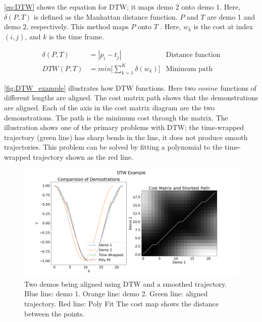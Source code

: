  \autoref{eq:DTW} shows the equation for DTW; it maps demo 2 onto demo 1. Here, $\delta (P, T)$ is defined as the Manhattan distance function. $P$ and $T$ are demo 1 and demo 2, respectively. This method maps $P$ onto $T$ . Here, $w_k$ is the cost at index $(i,j)$, and $k$ is the time frame.
 
 \begin{equation} 
    \begin{aligned} 
         \delta (P,T) &= | p_i - t_j| & \text{Distance function} \\ 
        DTW(P,T) &= min \Bigg[ \sum_{k=1}^{K} \delta (w_k) \Bigg] & \text{Minimum path} 
    \end{aligned} 
    \label{eq:DTW} 
\end{equation} 

 
 
 \autoref{fig:DTW_example} illustrates how DTW functions. Here two $cosine$ functions of different lengths are aligned. The cost matrix path shows that the demonstrations are aligned. Each of the axis in the cost matrix diagram are the two demonstrations. The path is the minimum cost through the matrix. The illustration shows one of the primary problems with DTW; the time-wrapped trajectory (green line) has sharp bends in the line, it does not produce smooth trajectories. This problem can be solved by fitting a polynomial to the time-wrapped trajectory shown as the red line.  
 
 \begin{figure}[htb!]
     \centering
     \includegraphics[scale=0.3]{images/background/DTW_example.png}
     \caption[DTW Example]{Two demos being aligned using DTW and a smoothed trajectory. Blue line: demo 1. Orange line: demo 2. Green line: aligned trajectory. Red line: Poly Fit The cost map shows the distance between the points. }
     \label{fig:DTW_example}
 \end{figure}



